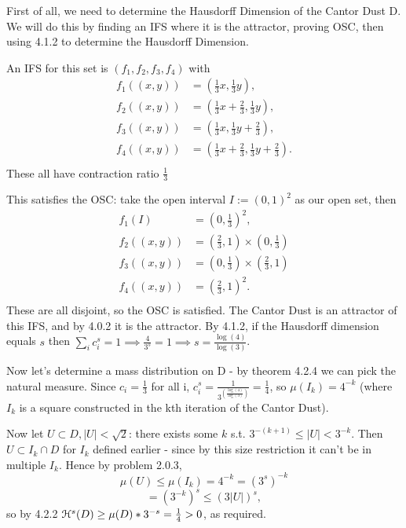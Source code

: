 First of all, we need to determine the Hausdorff Dimension of the Cantor Dust D. We will do this by finding an IFS where it is the attractor, proving OSC, then using 4.1.2 to determine the Hausdorff Dimension.

An IFS for this set is 
 \((f_1, f_2, f_3, f_4)\) with
\begin{align*}
    f_1((x, y)) &= \left(\frac{1}{3}x, \frac{1}{3}y\right),\\
    f_2((x, y)) &= \left(\frac{1}{3}x + \frac{2}{3}, \frac{1}{3}y\right),\\
    f_3((x, y)) &= \left(\frac{1}{3}x, \frac{1}{3}y + \frac{2}{3}\right),\\
    f_4((x, y)) &= \left(\frac{1}{3}x + \frac{2}{3}, \frac{1}{3}y + \frac{2}{3}\right).\\
\end{align*}
These all have contraction ratio $\frac{1}{3}$

This satisfies the OSC: take the open interval $I := (0,1)^2$ as our open set, then 
\begin{align*}
    f_1(I) &= (0, \frac{1}{3})^2,\\
    f_2((x, y)) &= (\frac{2}{3}, 1)\times(0, \frac{1}{3})\\
    f_3((x, y)) &= (0, \frac{1}{3})\times(\frac{2}{3}, 1)\\
    f_4((x, y)) &= (\frac{2}{3}, 1)^2.\\
\end{align*}
These are all disjoint, so the OSC is satisfied. The Cantor Dust is an attractor of this IFS, and by 4.0.2 it is the attractor. By 4.1.2, if the Hausdorff dimension equals $s$ then $\sum_i c_i^s = 1 \implies \frac{4}{3^s} = 1 \implies s = \frac{\log(4)}{\log(3)}$. 

Now let's determine a mass distribution on D - by theorem 4.2.4 we can pick the natural measure. Since $c_i = \frac{1}{3}$ for all i, $c_i^s = \frac{1}{3^(\frac{\log(4)}{\log(3)})} = \frac{1}{4}$, so $\mu(I_k) = 4^{-k}$ (where $I_k$ is a square constructed in the kth iteration of the Cantor Dust).

Now let $U \subset D, |U| < \sqrt{2}$: there exists some $k$ s.t. $3^{-(k+1)} \leq |U| < 3^{-k}$. Then $U \subset I_k \cap D$ for $I_k$ defined earlier - since by this size restriction it can't be in multiple $I_k$. Hence by problem 2.0.3, 
$$ \mu(U) \leq \mu(I_k) = 4^{-k} = (3^s)^{-k}$$
$$ = (3^{-k})^s \leq (3|U|)^s,$$ 
so by 4.2.2 $\mathcal{H}^s(D) \geq \mu(D)*3^{-s} = \frac{1}{4} > 0$, as required.
